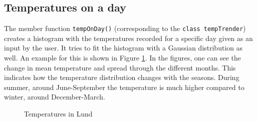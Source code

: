 \subsection{Temperatures on a day}
The member function \texttt{tempOnDay()} (corresponding to the \texttt{class tempTrender}) creates a histogram with the temperatures recorded for a specific day given as an input by the user. It tries to fit the histogram with a Gaussian distribution as well. An example for this is shown in Figure \ref{fig:LundTeml}. In the figures, one can see the change in mean temperature and spread through the different months. This indicates how the temperature distribution changes with the seasons. During summer, around June-September the temperature is much higher compared to winter, around December-March. 
\begin{figure}[H]
    \centering
    \quad
    \caption{Temperatures in Lund}
    \label{fig:LundTeml}
\end{figure}

